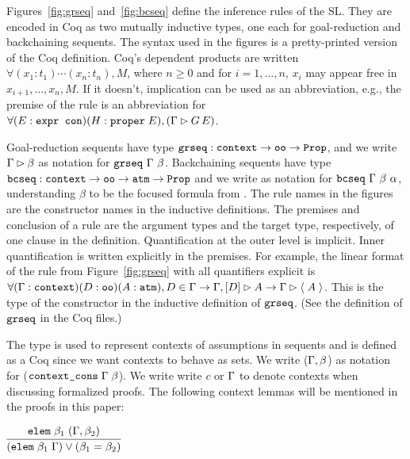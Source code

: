 %
Figures~\ref{fig:grseq} and~\ref{fig:bcseq} define the inference rules
of the SL.  They are encoded in Coq as two mutually inductive types,
one each for goal-reduction and backchaining sequents.  The syntax
used in the figures is a pretty-printed version of the Coq definition.
Coq's dependent products are written
$\forall(x_1:t_1)\cdots(x_n:t_n),M$, where $n\ge0$ and for $i=1,\ldots,
n$, $x_i$ may appear free in $x_{i+1},\ldots,x_n,M$.  If it doesn't,
implication can be used as an abbreviation, e.g., the premise of the
\rlnmsall{} rule is an abbreviation for $\forall (E : \hybridtm{expr
  con})(H:\sltm{proper} \; E), (\seqsl[\Gamma]{G \, E})$.

Goal-reduction sequents have type $\sltm{grseq} : \sltm{context}
\rightarrow \sltm{oo} \rightarrow \coqtm{Prop}$, and we write
$\seqsl{\beta}$ as notation for $\sltm{grseq}~\dyncon{}~
\beta$. Backchaining sequents have type $\sltm{bcseq} : \sltm{context}
\rightarrow \sltm{oo} \rightarrow \sltm{atm} \rightarrow \coqtm{Prop}$
and we write \bchsl{\beta}{\alpha} as notation for $\sltm{bcseq}~
\dyncon{}~ \beta~ \alpha$, understanding $\beta$ to be the focused
formula from \dyncon{}. The rule names in the figures are the
constructor names in the inductive definitions.  The premises and
conclusion of a rule are the argument types and the target type,
respectively, of one clause in the definition.  Quantification at the
outer level is implicit.  Inner quantification is written explicitly
in the premises.  For example, the linear format of the \rlnmsinit{}
rule from Figure~\ref{fig:grseq} with all quantifiers explicit is
$\forall (\Gamma : \sltm{context}) (D : \sltm{oo}) (A :\sltm{atm}),D
\in \Gamma \rightarrow \bchsl[\Gamma]{D}{A} \rightarrow
\seqsl[\Gamma]{\atom{A}}$.  This is the type of the \rlnmsinit{}
constructor in the inductive definition of $\sltm{grseq}$.  (See the
definition of $\sltm{grseq}$ in the Coq files.)

The type  is used to represent contexts of assumptions
in sequents and is defined as a Coq   since
we want contexts to behave as sets. We write ($\dyncon{}, \beta$) as
notation for ($\sltm{context\_cons} \; \dyncon{} \; \beta$). We write
write $c$ or $\dyncon{}$ to denote contexts when discussing formalized
proofs. The following context lemmas will be mentioned in the proofs in this paper:
\begin{lem}
$\vcenter{\infer{(\mathtt{elem} \; \beta_1 \; \dyncon{}) \vee (\beta_1 = \beta_2)}{\mathtt{elem} \; \beta_1 \; (\dyncon{}, \beta_2)}}$
\end{lem}

